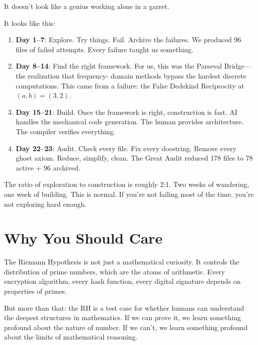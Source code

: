\documentclass[11pt,a4paper]{article}
\begin{document}
It doesn't look like a genius working alone in a garret.

It looks like this:

\begin{enumerate}
  \item \textbf{Day 1--7}: Explore. Try things. Fail. Archive
    the failures. We produced 96 files of failed attempts. Every
    failure taught us something.

  \item \textbf{Day 8--14}: Find the right framework. For us,
    this was the Parseval Bridge---the realization that frequency-
    domain methods bypass the hardest discrete computations. This
    came from a failure: the False Dedekind Reciprocity at
    $(a,b) = (3,2)$.

  \item \textbf{Day 15--21}: Build. Once the framework is right,
    construction is fast. AI handles the mechanical code generation.
    The human provides architecture. The compiler verifies
    everything.

  \item \textbf{Day 22--23}: Audit. Check every file. Fix every
    docstring. Remove every ghost axiom. Reduce, simplify, clean.
    The Great Audit reduced 178 files to 78 active + 96 archived.
\end{enumerate}

The ratio of exploration to construction is roughly 2:1. Two weeks
of wandering, one week of building. This is normal. If you're not
failing most of the time, you're not exploring hard enough.

\section*{Why You Should Care}

The Riemann Hypothesis is not just a mathematical curiosity. It
controls the distribution of prime numbers, which are the atoms
of arithmetic. Every encryption algorithm, every hash function,
every digital signature depends on properties of primes.

But more than that: the RH is a test case for whether humans can
understand the deepest structures in mathematics. If we can prove
it, we learn something profound about the nature of number. If we
can't, we learn something profound about the limits of mathematical
reasoning.
\end{document}
